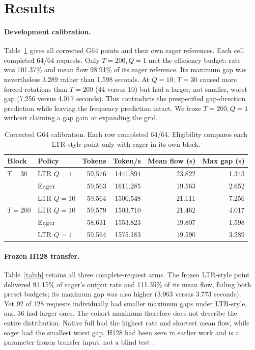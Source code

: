 \documentclass[10pt]{article}
\begin{document}
\section{Results}
\paragraph{Development calibration.}
Table~\ref{tab:g} gives all corrected G64 points and their own eager references. Each cell completed 64/64 requests. Only $T=200,Q=1$ met the efficiency budget: rate was 101.37\% and mean flow 98.91\% of its eager reference. Its maximum gap was nevertheless 3.289 rather than 1.598 seconds. At $Q=10$, $T=30$ caused more forced rotations than $T=200$ (44 versus 10) but had a larger, not smaller, worst gap (7.256 versus 4.017 seconds). This contradicts the prespecified gap-direction prediction while leaving the frequency prediction intact. We froze $T=200,Q=1$ without claiming a gap gain or expanding the grid.

\begin{table}[t]
\centering\small
\caption{Corrected G64 calibration. Each row completed 64/64. Eligibility compares each LTR-style point only with eager in its own block.}
\label{tab:g}
\begin{tabular}{llrrrr}
\toprule
Block & Policy & Tokens & Token/s & Mean flow (s) & Max gap (s) \\
\midrule
$T=30$ & LTR $Q=1$ & 59,576 & 1441.894 & 23.822 & 1.343 \\
        & Eager & 59,563 & 1611.285 & 19.563 & 2.652 \\
        & LTR $Q=10$ & 59,564 & 1500.548 & 21.111 & 7.256 \\
$T=200$ & LTR $Q=10$ & 59,579 & 1503.710 & 21.462 & 4.017 \\
        & Eager & 58,631 & 1553.823 & 19.807 & 1.598 \\
        & LTR $Q=1$ & 59,564 & 1575.183 & 19.590 & 3.289 \\
\bottomrule
\end{tabular}
\end{table}

\paragraph{Frozen H128 transfer.}
Table~\ref{tab:h} retains all three complete-request arms. The frozen LTR-style point delivered 91.15\% of eager's output rate and 111.35\% of its mean flow, failing both preset budgets; its maximum gap was also higher (3.963 versus 3.773 seconds). Yet 92 of 128 requests individually had smaller maximum gaps under LTR-style, and 36 had larger ones. The cohort maximum therefore does not describe the entire distribution. Native full had the highest rate and shortest mean flow, while eager had the smallest worst gap. H128 had been seen in earlier work and is a parameter-frozen transfer input, not a blind test \cite{htransfer}.
\end{document}
